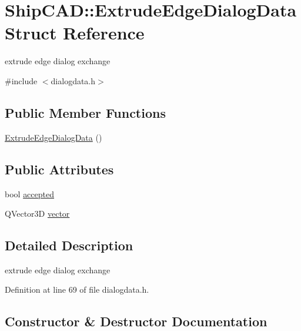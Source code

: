 \hypertarget{structShipCAD_1_1ExtrudeEdgeDialogData}{}\section{Ship\+C\+AD\+:\+:Extrude\+Edge\+Dialog\+Data Struct Reference}
\label{structShipCAD_1_1ExtrudeEdgeDialogData}


extrude edge dialog exchange  




{\ttfamily \#include $<$dialogdata.\+h$>$}

\subsection*{Public Member Functions}
\begin{DoxyCompactItemize}
\item 
\hyperlink{structShipCAD_1_1ExtrudeEdgeDialogData_a412fc868ad680d1d418ea16d9dbbfed1}{Extrude\+Edge\+Dialog\+Data} ()
\end{DoxyCompactItemize}
\subsection*{Public Attributes}
\begin{DoxyCompactItemize}
\item 
bool \hyperlink{structShipCAD_1_1ExtrudeEdgeDialogData_acacc5c53abda4c79c30f52d96de6d1f9}{accepted}
\item 
Q\+Vector3D \hyperlink{structShipCAD_1_1ExtrudeEdgeDialogData_aa1841a8d73ac4887e46f3f2d0712770c}{vector}
\end{DoxyCompactItemize}


\subsection{Detailed Description}
extrude edge dialog exchange 

Definition at line 69 of file dialogdata.\+h.



\subsection{Constructor \& Destructor Documentation}
